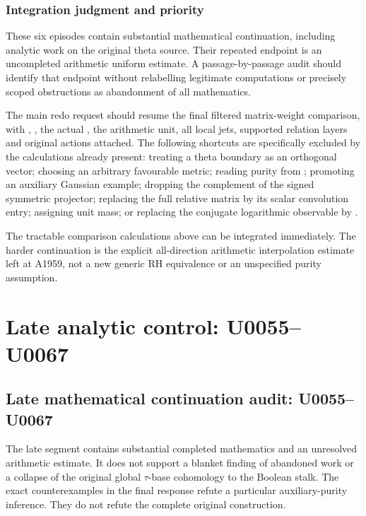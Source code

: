 \subsubsection{Integration judgment and
priority}\label{integration-judgment-and-priority}

These six episodes contain substantial mathematical continuation,
including analytic work on the original theta source. Their repeated
endpoint is an uncompleted arithmetic uniform estimate. A
passage-by-passage audit should identify that endpoint without
relabelling legitimate computations or precisely scoped obstructions as
abandonment of all mathematics.

The main redo request should resume the final filtered matrix-weight
comparison, with \protect{}, \protect{}, the actual
\protect{}, the arithmetic unit, all local jets, supported
relation layers and original actions attached. The following shortcuts
are specifically excluded by the calculations already present: treating
a theta boundary as an orthogonal vector; choosing an arbitrary
favourable metric; reading purity from \protect{}; promoting
an auxiliary Gaussian example; dropping the complement of the signed
symmetric projector; replacing the full relative matrix by its scalar
convolution entry; assigning unit mass; or replacing the conjugate
logarithmic observable by \protect{}.

The tractable comparison calculations above can be integrated
immediately. The harder continuation is the explicit all-direction
arithmetic interpolation estimate left at A1959, not a new generic RH
equivalence or an unspecified purity assumption.

\clearpage

\section{Late analytic control:
U0055--U0067}\label{late-analytic-control-u0055u0067}

\subsection{Late mathematical continuation audit:
U0055--U0067}\label{late-mathematical-continuation-audit-u0055u0067}

The late segment contains substantial completed mathematics and an
unresolved arithmetic estimate. It does not support a blanket finding of
abandoned work or a collapse of the original global
\allowbreak{}\ensuremath{τ}\allowbreak{}-base cohomology to the Boolean
stalk. The exact counterexamples in the final response refute a
particular auxiliary-purity inference. They do not refute the complete
original construction.

